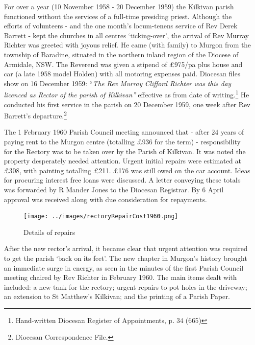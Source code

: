 For over a year (10 November 1958 - 20 December 1959) the Kilkivan parish functioned without the services of a full-time presiding priest. Although the efforts of volunteers - and the one month's locum-tenens service of Rev Derek Barrett - kept the churches in all centres `ticking-over', the arrival of Rev Murray Richter was greeted with joyous relief. He came (with family) to Murgon from the township of Baradine, situated in the northern inland region of the Diocese of Armidale, NSW. The Reverend was given a stipend of \pounds975/pa plus house and car (a late 1958 model Holden) with all motoring expenses paid. Diocesan files show on 16 December 1959: ``\emph{The Rev Murray Clifford Richter was this day licenced as Rector of the parish of Kilkivan''} effective as from date of writing.\footnote{Hand-written Diocesan Register of Appointments, p. 34 (665)} He conducted his first service in the parish on 20 December 1959, one week after Rev Barrett's departure.\footnote{Diocesan Correspondence File.}


The 1 February 1960 Parish Council meeting announced that - after 24 years of paying rent to the Murgon centre (totalling \pounds936 for the term) - responsibility for the Rectory was to be taken over by the Parish of Kilkivan. It was noted the property desperately needed attention. Urgent initial repairs were estimated at \pounds308, with painting totalling \pounds211. \pounds176 was still owed on the car account. Ideas for procuring interest free loans were discussed. A letter conveying these totals was forwarded by R Mander Jones to the Diocesan Registrar. By 6 April approval was received along with due consideration for repayments.









\begin{figure}[!htb]
\begin{center}
\texttt{[image: ../images/rectoryRepairCost1960.png]}
\caption{Details of repairs}
\end{center}
\end{figure}




After the new rector's arrival, it became clear that urgent attention was required to get the parish `back on its feet'. The new chapter in Murgon's history brought an immediate surge in energy, as seen in the minutes of the first Parish Council meeting chaired by Rev Richter in February 1960. The main items dealt with included: a new tank for the rectory; urgent repairs to pot-holes in the driveway; an extension to St Matthew's Kilkivan; and the printing of a Parish Paper.



